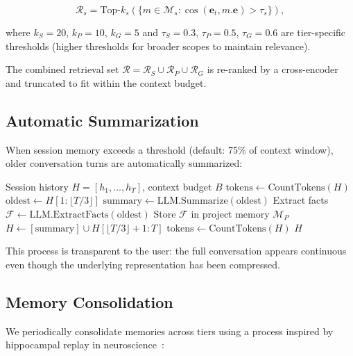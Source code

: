 \begin{equation}
\mathcal{R}_s = \text{Top-}k_s\left(\{m \in \mathcal{M}_s : \cos(\bm{e}_t, m.\bm{e}) > \tau_s\}\right),
\end{equation}

where $k_S = 20$, $k_P = 10$, $k_G = 5$ and $\tau_S = 0.3$, $\tau_P = 0.5$, $\tau_G = 0.6$ are tier-specific thresholds (higher thresholds for broader scopes to maintain relevance).

The combined retrieval set $\mathcal{R} = \mathcal{R}_S \cup \mathcal{R}_P \cup \mathcal{R}_G$ is re-ranked by a cross-encoder~\cite{nogueira2019passage} and truncated to fit within the context budget.

\subsection{Automatic Summarization}

When session memory exceeds a threshold (default: 75\% of context window), older conversation turns are automatically summarized:

\begin{algorithm}[H]
\caption{Adaptive Memory Summarization}
\label{alg:summarize}
\begin{algorithmic}[1]
\Require Session history $H = [h_1, \ldots, h_T]$, context budget $B$
\State $\text{tokens} \gets \text{CountTokens}(H)$
    \State $\text{oldest} \gets H[1:\lfloor T/3 \rfloor]$ 
    \State $\text{summary} \gets \text{LLM.Summarize}(\text{oldest})$
    \State Extract facts $\mathcal{F} \gets \text{LLM.ExtractFacts}(\text{oldest})$
    \State Store $\mathcal{F}$ in project memory $\mathcal{M}_P$
    \State $H \gets [\text{summary}] \cup H[\lfloor T/3 \rfloor + 1 : T]$
    \State $\text{tokens} \gets \text{CountTokens}(H)$
\EndWhile
\State \Return $H$
\end{algorithmic}
\end{algorithm}

This process is transparent to the user: the full conversation appears continuous even though the underlying representation has been compressed.

\subsection{Memory Consolidation}

We periodically consolidate memories across tiers using a process inspired by hippocampal replay in neuroscience~\cite{mcclelland1995memory}:

